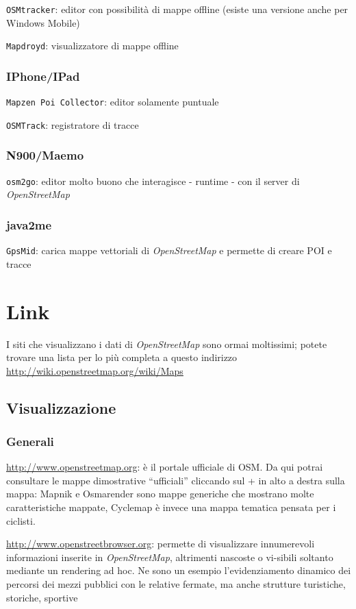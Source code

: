 \documentclass[a4paper,twoside,12pt,]{article}
\newcommand{\osm}{\emph{OpenStreetMap}\xspace}
\newcommand{\soft}[1]{\texttt{#1}}
\begin{document}
\soft{OSMtracker}: editor con possibilità di mappe offline (esiste una versione anche per Windows Mobile)

\soft{Mapdroyd}: visualizzatore di mappe offline
\subsubsection{IPhone/IPad}

\soft{Mapzen Poi Collector}: editor solamente puntuale

\soft{OSMTrack}: registratore di tracce
\subsubsection{N900/Maemo}

\soft{osm2go}: editor molto buono che interagisce - runtime - con il server di \osm
\subsubsection{java2me}

\soft{GpsMid}: carica mappe vettoriali di \osm e permette di creare POI e tracce

\section{Link}
I siti che visualizzano i dati di \osm sono ormai moltissimi; potete trovare una lista per lo più completa a questo indirizzo \url{http://wiki.openstreetmap.org/wiki/Maps}
\subsection{Visualizzazione}
\subsubsection{Generali}
\url{http://www.openstreetmap.org}: è il portale ufficiale di OSM. Da qui potrai consultare le mappe dimostrative “ufficiali” cliccando sul + in alto a destra sulla mappa:
Mapnik e Osmarender sono mappe generiche che mostrano molte caratteristiche mappate,
Cyclemap è invece una mappa tematica pensata per i ciclisti.

\url{http://www.openstreetbrowser.org}: permette di visualizzare innumerevoli informazioni inserite in \osm, altrimenti nascoste o vi-sibili soltanto mediante un rendering ad hoc. Ne sono un esempio l'evidenziamento dinamico dei percorsi dei mezzi pubblici con le relative fermate, ma anche strutture turistiche, storiche, sportive
\end{document}
